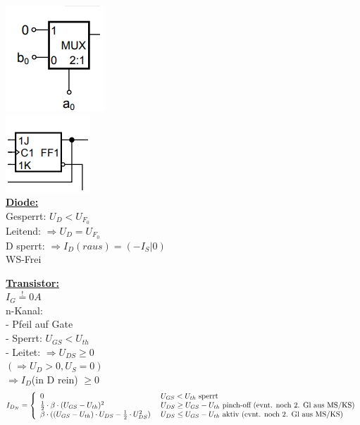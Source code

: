 \documentclass[8pt]{extarticle}
\begin{document}
\newpage

\begin{minipage}{0.33\textwidth}
\vspace{-1cm}
\includegraphics[scale=0.40]{Mult.png}\\
\includegraphics[scale=0.40]{FF.png}\\

\underline{\textbf{Diode:}}\\
Gesperrt: $U_D < U_{F_0}$\\
Leitend: $\Rightarrow U_D = U_{F_0}$\\
D sperrt: $\Rightarrow I_D(raus) = (-I_S|0)$\\
WS-Frei

\underline{\textbf{Transistor:}}\\
$I_G \stackrel{!}{=} 0A$\\

n-Kanal:\\
- Pfeil auf Gate\\
- Sperrt: $U_{GS} < U_{th}$\\
- Leitet: $\Rightarrow U_{DS} \geq 0$\\
\phantom{sssssiisi} $ (\Rightarrow U_D > 0, U_S = 0)$\\
\phantom{sssssiisssi}$\Rightarrow I_D$(in D rein) $\geq 0$\\
\[I_{D_N} = \left\{
  \begin{array}{ll}
      0 & U_{GS} < U_{th}~$sperrt$\\
        \frac{1}{2} \cdot \beta \cdot(U_{GS} - U_{th})^2  \ & U_{DS} \ge U_{GS} - U_{th}$~pinch-off (evnt. noch 2. Gl aus MS/KS)$\\
        \beta \cdot((U_{GS} - U_{th}) \cdot U_{DS} - \frac{1}{2} \cdot U_{DS}^2)  \ & U_{DS} \leq U_{GS} - U_{th}$~aktiv (evnt. noch 2. Gl aus MS/KS)$\\
  \end{array}
\right.
\]


\end{minipage}
\end{document}
